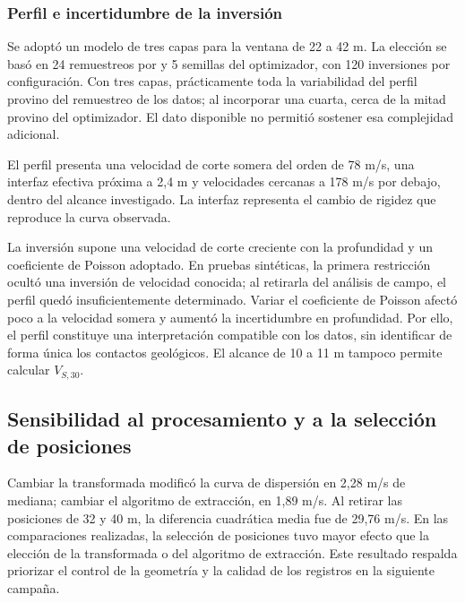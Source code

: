 \subsubsection{Perfil e incertidumbre de la inversión}

Se adoptó un modelo de tres capas para la ventana de 22 a 42 m. La elección se basó en 24 remuestreos por  y 5 semillas del optimizador, con 120 inversiones por configuración. Con tres capas, prácticamente toda la variabilidad del perfil provino del remuestreo de los datos; al incorporar una cuarta, cerca de la mitad provino del optimizador. El dato disponible no permitió sostener esa complejidad adicional.

El perfil presenta una velocidad de corte somera del orden de 78 m/s, una interfaz efectiva próxima a 2,4 m y velocidades cercanas a 178 m/s por debajo, dentro del alcance investigado. La interfaz representa el cambio de rigidez que reproduce la curva observada.

La inversión supone una velocidad de corte creciente con la profundidad y un coeficiente de Poisson adoptado. En pruebas sintéticas, la primera restricción ocultó una inversión de velocidad conocida; al retirarla del análisis de campo, el perfil quedó insuficientemente determinado. Variar el coeficiente de Poisson afectó poco a la velocidad somera y aumentó la incertidumbre en profundidad. Por ello, el perfil constituye una interpretación compatible con los datos, sin identificar de forma única los contactos geológicos.  El alcance de 10 a 11 m tampoco permite calcular $V_{S,30}$.

\subsection{Sensibilidad al procesamiento y a la selección de posiciones}
\label{sec:sensibilidad-procesamiento}

Cambiar la transformada modificó la curva de dispersión en 2,28 m/s de mediana; cambiar el algoritmo de extracción, en 1,89 m/s. Al retirar las posiciones de 32 y 40 m, la diferencia cuadrática media fue de 29,76 m/s. En las comparaciones realizadas, la selección de posiciones tuvo mayor efecto que la elección de la transformada o del algoritmo de extracción. Este resultado respalda priorizar el control de la geometría y la calidad de los registros en la siguiente campaña.

